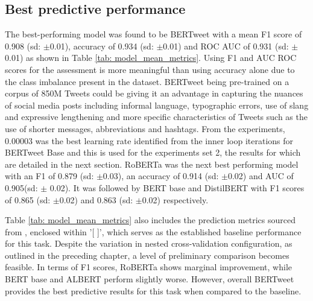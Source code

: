 \subsection{Best predictive performance}
The best-performing model was found to be BERTweet with a mean F1 score of 0.908 (sd: $\pm$0.01), accuracy of 0.934 (sd: $\pm$0.01) and ROC AUC of 0.931 (sd: $\pm$0.01) as shown in Table \ref{tab: model_mean_metrics}. Using F1 and AUC ROC scores for the assessment is more meaningful than using accuracy alone due to the class imbalance present in the dataset. BERTweet being pre-trained on a corpus of 850M Tweets could be giving it an advantage in capturing the nuances of social media posts including informal language, typographic errors, use of slang and expressive lengthening and more specific characteristics of Tweets such as the use of shorter messages, abbreviations and hashtags. From the experiments, 0.00003 was the best learning rate identified from the inner loop iterations for BERTweet Base and this is used for the experiments set 2, the results for which are detailed in the next section. RoBERTa was the next best performing model with an F1 of 0.879 (sd: $\pm$0.03), an accuracy of 0.914 (sd: $\pm$0.02) and AUC of 0.905(sd: $\pm$ 0.02). It was followed by BERT base and DistilBERT with F1 scores of 0.865 (sd: $\pm$0.02) and 0.863 (sd: $\pm$0.02) respectively.

Table \ref{tab: model_mean_metrics} also includes the prediction metrics sourced from \cite{jin_complaint_2020}, enclosed within '[ ]', which serves as the established baseline performance for this task. Despite the variation in nested cross-validation configuration, as outlined in the preceding chapter, a level of preliminary comparison becomes feasible. In terms of F1 scores, RoBERTa shows marginal improvement, while BERT base and ALBERT perform slightly worse. However, overall BERTweet provides the best predictive results for this task when compared to the baseline.\\

